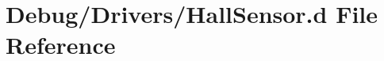 \hypertarget{HallSensor_8d}{}\section{Debug/\+Drivers/\+Hall\+Sensor.d File Reference}
\label{HallSensor_8d}
